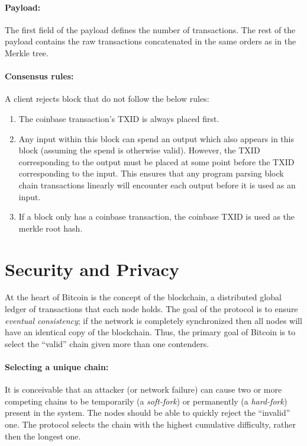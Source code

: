 \documentclass[]{report}   %
\begin{document}
\paragraph{Payload:} The first field of the payload defines the number of transactions. The rest of the payload contains the raw transactions concatenated in the same orders as in the Merkle tree.


\paragraph{Consensus rules:} A client rejects block that do not follow the below rules:
\begin{enumerate}
	\item The coinbase transaction's TXID is always placed first.
	\item Any input within this block can spend an output which also appears in this block (assuming the spend is otherwise valid). However, the TXID corresponding to the output must be placed at some point before the TXID corresponding to the input. This ensures that any program parsing block chain transactions linearly will encounter each output before it is used as an input.
\item If a block only has a coinbase transaction, the coinbase TXID is used as the merkle root hash.
\end{enumerate}





\section{Security and Privacy} 
\label{btc-security}
At the heart of Bitcoin is the concept of the blockchain, a distributed global ledger of transactions that each node holds. The goal of the protocol is to ensure {\em eventual consistency}; if the network is completely synchronized then all nodes will have an identical copy of the blockchain. Thus, the primary goal of Bitcoin is to select the ``valid'' chain given more than one contenders. 


\paragraph{Selecting a unique chain:} It is conceivable that an attacker (or network failure) can cause two or more competing chains to be temporarily (a {\em soft-fork}) or permanently (a {\em hard-fork}) present in the system. The nodes should be able to quickly reject the ``invalid'' one. The protocol selects the chain with the highest cumulative difficulty, rather then the longest one. 
\end{document}
